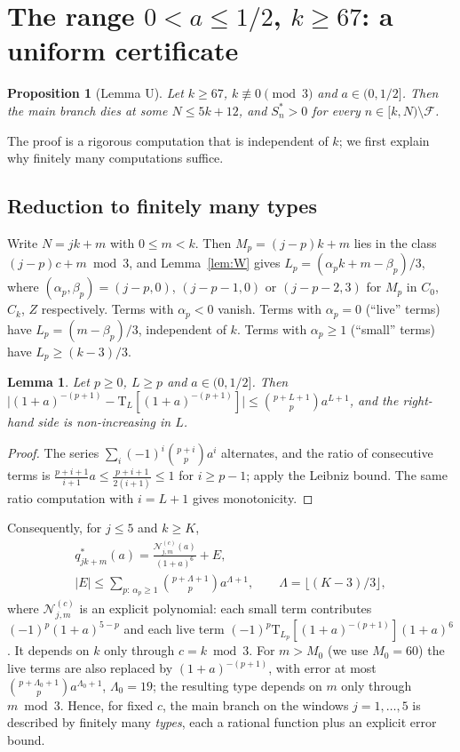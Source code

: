 \documentclass[11pt]{amsart}
\newtheorem{proposition}[theorem]{Proposition}
\newtheorem{lemma}[theorem]{Lemma}
\theoremstyle{definition}
\theoremstyle{remark}
\newcommand{\Tr}{\mathrm{T}}
\newcommand{\Cz}{C_0}
\newcommand{\Ck}{C_k}
\newcommand{\F}{\mathcal{F}}
\begin{document}
\section{The range \texorpdfstring{$0<a\le 1/2$, $k\ge 67$}{0 < a <= 1/2, k >= 67}: a uniform certificate}\label{sec:U}

\begin{proposition}[Lemma U]\label{prop:U}
Let $k\ge 67$, $k\not\equiv 0\pmod 3$ and $a\in(0,1/2]$. Then the main branch
dies at some $N\le 5k+12$, and $S^*_n>0$ for every $n\in[k,N)\setminus\F$.
\end{proposition}

The proof is a rigorous computation that is independent of $k$; we first explain
why finitely many computations suffice.

\subsection{Reduction to finitely many types}
Write $N=jk+m$ with $0\le m<k$. Then $M_p=(j-p)k+m$ lies in the class
$(j-p)c+m\bmod 3$, and Lemma~\ref{lem:W} gives
$L_p=(\alpha_pk+m-\beta_p)/3$, where $(\alpha_p,\beta_p)=(j-p,0)$, $(j-p-1,0)$ or
$(j-p-2,3)$ for $M_p$ in $\Cz$, $\Ck$, $Z$ respectively. Terms with $\alpha_p<0$
vanish. Terms with $\alpha_p=0$ (``live'' terms) have $L_p=(m-\beta_p)/3$,
independent of $k$. Terms with $\alpha_p\ge 1$ (``small'' terms) have
$L_p\ge(k-3)/3$.

\begin{lemma}\label{lem:tail}
Let $p\ge 0$, $L\ge p$ and $a\in(0,1/2]$. Then
$\big|(1+a)^{-(p+1)}-\Tr_L[(1+a)^{-(p+1)}]\big|\le\binom{p+L+1}{p}a^{L+1}$, and the
right-hand side is non-increasing in $L$.
\end{lemma}

\begin{proof}
The series $\sum_i(-1)^i\binom{p+i}{p}a^i$ alternates, and the ratio of consecutive
terms is $\frac{p+i+1}{i+1}a\le\frac{p+i+1}{2(i+1)}\le 1$ for $i\ge p-1$; apply the
Leibniz bound. The same ratio computation with $i=L+1$ gives monotonicity.
\end{proof}

Consequently, for $j\le 5$ and $k\ge K$,
\[
\begin{gathered}
q^*_{jk+m}(a)=\frac{\mathcal{N}^{(c)}_{j,m}(a)}{(1+a)^6}+E,\\
|E|\le\sum_{p:\,\alpha_p\ge 1}\binom{p+\Lambda+1}{p}a^{\Lambda+1},\qquad
\Lambda=\lfloor (K-3)/3\rfloor,
\end{gathered}
\]
where $\mathcal{N}^{(c)}_{j,m}$ is an explicit polynomial: each small term
contributes $(-1)^p(1+a)^{5-p}$ and each live term $(-1)^p\Tr_{L_p}[(1+a)^{-(p+1)}](1+a)^6$.
It depends on $k$ only through $c=k\bmod 3$. For $m>M_0$ (we use $M_0=60$) the live
terms are also replaced by $(1+a)^{-(p+1)}$, with error at most
$\binom{p+\Lambda_0+1}{p}a^{\Lambda_0+1}$, $\Lambda_0=19$; the resulting type depends
on $m$ only through $m\bmod 3$. Hence, for fixed $c$, the main branch on the
windows $j=1,\dots,5$ is described by finitely many \emph{types}, each a rational
function plus an explicit error bound.
\end{document}
